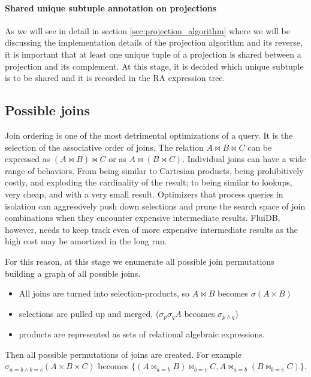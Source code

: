 \paragraph{Shared unique subtuple annotation on projections}

As we will see in detail in
section \ref{sec:projection_algorithm} where we will be discussing the
implementation details of the projection algorithm and its reverse, it
is important that at least one unique tuple of a projection is shared
between a projection and its complement. At this stage, it is decided
which unique subtuple is to be shared and it is recorded in the RA
expression tree.


\subsection{Possible joins}
\label{sec:possible_joins}

Join ordering is one of the most detrimental optimizations of a query.
It is the selection of the associative order of joins.  The relation
\(A \Join B \Join C\) can be expressed as \((A \Join B) \Join C\) or as
\(A \Join (B \Join C)\).  Individual joins can have a wide range of
behaviors. From being similar to Cartesian products, being
prohibitively costly, and exploding the cardinality of the result; to
being similar to lookups, very cheap, and with a very small result.
Optimizers that process queries in isolation can aggressively push
down selections and prune the search space of join combinations when
they encounter expensive intermediate results.  FluiDB, however, needs
to keep track even of more expensive intermediate results as the high
cost may be amortized in the long run.

For this reason, at this stage we enumerate all possible join
permutations building a graph of all possible joins.

\begin{itemize}
\item All joins are turned into selection-products, so \(A \Join B\)
becomes \(\sigma(A \times B)\)
\item selections are pulled up and merged, (\(\sigma_p \sigma_q A\)
becomes \(\sigma_{p \land q}\))
\item products are represented as sets of relational algebraic
expressions.
\end{itemize}

Then all possible permutations of joins are created. For example
\(\sigma_{a=b \land b=c}(A \times B \times C)\) becomes \(\{(A
\Join_{a=b} B) \Join_{b=c} C, A \Join_{a=b} (B \Join_{b=c} C)\}\).

